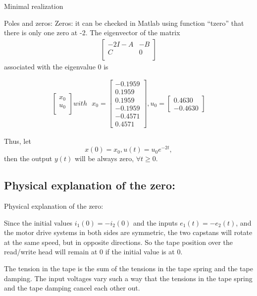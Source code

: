 \begin{subsection}{Minimal realization}
\begin{frame}{Poles and zeros:}
Zeros: it can be checked in Matlab using function “tzero”
that there is only one zero at -2. The eigenvector of the
matrix
\begin{align*}
\begin{bmatrix}
    -2I-A&-B\\
    C&0\\
\end{bmatrix}
\end{align*}
associated with the eigenvalue 0 is

\begin{align*}
\begin{bmatrix}
    x_0\\
    u_0\\
\end{bmatrix} 
with\text{ }x_0=
    \begin{bmatrix}
    -0.1959\\
    0.1959\\
    0.1959\\
    -0.1959\\
    -0.4571\\
    0.4571
\end{bmatrix}, u_0=\begin{bmatrix}
    0.4630\\
    -0.4630
\end{bmatrix}
\end{align*}

Thus, let
$$x(0)=x_0, u(t)=u_0e^{-2t},$$
then the output $y(t)$ will be always zero, $\forall t \geq 0.$

\end{frame}



\subsection{Physical explanation of the zero:}
\begin{frame}{Physical explanation of the zero:}

Since the initial values $i_1(0)=-i_2(0)$ and the inputs
$e_1(t)=-e_2(t)$, and the motor drive systems in both sides
are symmetric, the two capstans will rotate at the same
speed, but in opposite directions. So the tape position over
the read/write head will remain at 0 if the initial value is
at 0.

The tension in the tape is the sum of the tensions in the
tape spring and the tape damping. The input voltages vary
such a way that the tensions in the tape spring and the tape
damping cancel each other out.



\end{frame}
\end{subsection}
